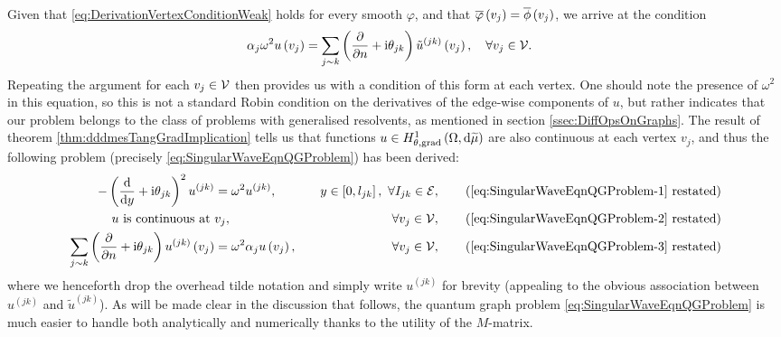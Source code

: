 Given that \eqref{eq:DerivationVertexConditionWeak} holds for every smooth $\varphi$, and that $\overline{\varphi}\left( v_j \right)=\overline{\phi}\left( v_j \right)$, we arrive at the condition
\begin{align*}
	\alpha_j\omega^2 u\left( v_j \right) &= \sum_{j\sim k}\left( \dfrac{\partial }{\partial n} + \mathrm{i}\theta_{jk} \right)\tilde{u}^{(jk)}\left( v_j \right), \quad \forall v_j \in \mathcal{V}.
\end{align*}
Repeating the argument for each $v_j\in \mathcal{V}$ then provides us with a condition of this form at each vertex.
One should note the presence of $\omega^2$ in this equation, so this is not a standard Robin condition on the derivatives of the edge-wise components of $u$, but rather indicates that our problem belongs to the class of problems with generalised resolvents, as mentioned in section \ref{ssec:DiffOpsOnGraphs}.
The result of theorem \ref{thm:dddmesTangGradImplication} tells us that functions $u\in H^1_{\theta, \mathrm{grad}}\left( \Omega, \mathrm{d}\widetilde{\mu} \right)$ are also continuous at each vertex $v_j$, and thus the following problem (precisely \eqref{eq:SingularWaveEqnQGProblem}) has been derived:
\begin{subequations}
	\begin{align*}
		-\bracs{\diff{}{y} + \rmi\qm_{jk}}^2 u^{(jk)} &= \omega^2 u^{(jk)}, \quad &y\in\sqbracs{0,l_{jk}}, \ \forall I_{jk}\in\edgeSet, \tag{\eqref{eq:SingularWaveEqnQGProblem-1} restated} \\
		u \text{ is continuous at } & v_j, \quad &\forall v_j\in\vertSet,  \tag{\eqref{eq:SingularWaveEqnQGProblem-2} restated} \\
		\sum_{j\con k}\bracs{\pdiff{}{n} + \rmi\qm_{jk}}u^{(jk)}\bracs{v_j} &= \omega^2\alpha_j u\bracs{v_j}, \quad &\forall v_j\in\vertSet, \tag{\eqref{eq:SingularWaveEqnQGProblem-3} restated}
	\end{align*}
\end{subequations}
where we henceforth drop the overhead tilde notation and simply write $u^{(jk)}$ for brevity (appealing to the obvious association between $u^{(jk)}$ and $\tilde{u}^{(jk)}$).
As will be made clear in the discussion that follows, the quantum graph problem \eqref{eq:SingularWaveEqnQGProblem} is much easier to handle both analytically and numerically thanks to the utility of the $M$-matrix.

